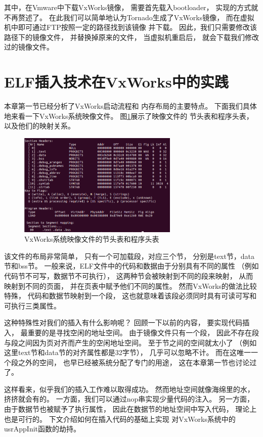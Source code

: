 其中，在Vmware中下载VxWorks镜像，
需要首先载入bootloader，
实现的方式就不再赘述了。
在此我们可以简单地认为Tornado生成了VxWorks镜像，
而在虚拟机中即可通过FTP按照一定的路径找到该镜像
并下载。
因此，我们只需要修改该路径下的镜像文件，
并替换掉原来的文件，
当虚拟机重启后，
就会下载我们修改过的镜像文件。

\section{ELF插入技术在VxWorks中的实践}

本章第一节已经分析了VxWorks启动流程和
内存布局的主要特点。
下面我们具体地来看一下VxWorks系统映像文件。
图\ref{shtandpht}展示了映像文件的
节头表和程序头表，以及他们的映射关系。

\begin{figure}[h!]
    \centering
    \includegraphics[width=0.68\textwidth]{figure/shtandpht.png}
    \caption{VxWorks系统映像文件的节头表和程序头表}
    \label{shtandpht}
\end{figure}

该文件的布局非常简单，
只有一个可加载段，对应三个节，
分别是text节，data节和bss节。
一般来说，ELF文件中的代码和数据由于分别具有不同的属性
（例如代码节不可写，数据节不可执行），
这两种节会被映射到不同的段来映射，
从而映射到不同的页面，
并在页表中赋予他们不同的属性。
然而VxWorks的做法比较特殊，
代码和数据节映射到一个段，
这也就意味着该段必须同时具有可读可写和可执行三类属性。

这种特殊性对我们的插入有什么影响呢？
回顾一下以前的内容，
要实现代码插入，
最重要的是寻找空闲的地址空间。
由于镜像文件只有一个段，
因此不存在段与段之间因为页对齐而产生的空闲地址空间。
至于节之间的空间就太小了
（例如这里text节和data节的对齐属性都是32字节），
几乎可以忽略不计。
而在这唯一一个段之外的空间，
也早已经被系统分配了专门的用途，
这在本章第一节也讨论过了。

这样看来，似乎我们的插入工作难以取得成功。
然而地址空间就像海绵里的水，
挤挤就会有的。
一方面，我们可以通过nop串实现少量代码的注入。
另一方面，由于数据节也被赋予了执行属性，
因此在数据节的地址空间中写入代码，
理论上也是可行的。
下文介绍如何在插入代码的基础上实现
对VxWorks系统中的usrAppInit函数的劫持。


